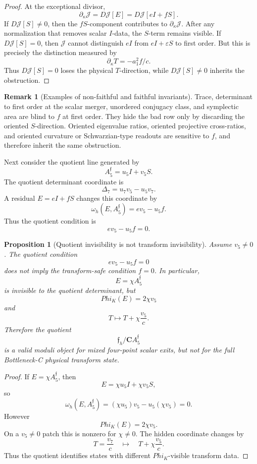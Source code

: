 \documentclass[11pt,a4paper]{amsart}
\def\Phi{Phi}%
\theoremstyle{plain}
\newtheorem{proposition}[theorem]{Proposition}
\theoremstyle{definition}
\newtheorem{remark}[theorem]{Remark}
\begin{document}
\begin{proof}
At the exceptional divisor,
\[
\partial_\kappa\mathcal J
=
D\mathcal J[E]
=
D\mathcal J[eI+fS].
\]
If \(D\mathcal J[S]\ne0\), then the \(fS\)-component contributes to
\(\partial_\kappa\mathcal J\).  After any normalization that removes scalar
\(I\)-data, the \(S\)-term remains visible.  If \(D\mathcal J[S]=0\), then
\(\mathcal J\) cannot distinguish \(eI\) from \(eI+\varepsilon S\) to first
order.  But this is precisely the distinction measured by
\[
\partial_\kappa T=-a_1^2 f/c.
\]
Thus \(D\mathcal J[S]=0\) loses the physical \(T\)-direction, while
\(D\mathcal J[S]\ne0\) inherits the obstruction.
\end{proof}

\begin{remark}[Examples of non-faithful and faithful invariants]
\label{rem:examples-local-invariant-no-go-bc}
Trace, determinant to first order at the scalar merger, unordered conjugacy
class, and symplectic area are blind to \(f\) at first order.  They hide the
bad row only by discarding the oriented \(S\)-direction.  Oriented eigenvalue
ratios, oriented projective cross-ratios, and oriented curvature or
Schwarzian-type readouts are sensitive to \(f\), and therefore inherit the
same obstruction.
\end{remark}

Next consider the quotient line generated by
\[
A_5^{\mathfrak f}=u_5I+v_5S.
\]
The quotient determinant coordinate is
\[
\Delta_7
=
u_7v_5-u_5v_7.
\]
A residual \(E=eI+fS\) changes this coordinate by
\[
\omega_h(E,A_5^{\mathfrak f})=ev_5-u_5f.
\]
Thus the quotient condition is
\[
ev_5-u_5f=0.
\]

\begin{proposition}[Quotient invisibility is not transform invisibility]
\label{prop:quotient-not-transform-invisibility-bc}
Assume \(v_5\ne0\).  The quotient condition
\[
ev_5-u_5f=0
\]
does not imply the transform-safe condition \(f=0\).  In particular,
\[
E=\chi A_5^{\mathfrak f}
\]
is invisible to the quotient determinant, but
\[
\Phi_K(E)=2\chi v_5
\]
and
\[
T\mapsto T+\chi\frac{v_5}{c}.
\]
Therefore the quotient
\[
\mathfrak f_h/\mathbf C A_5^{\mathfrak f}
\]
is a valid moduli object for mixed four-point scalar exits, but not for the
full Bottleneck-C physical transform state.
\end{proposition}

\begin{proof}
If \(E=\chi A_5^{\mathfrak f}\), then
\[
E=\chi u_5I+\chi v_5S,
\]
so
\[
\omega_h(E,A_5^{\mathfrak f})
=
(\chi u_5)v_5-u_5(\chi v_5)
=
0.
\]
However
\[
\Phi_K(E)=2\chi v_5.
\]
On a \(v_5\ne0\) patch this is nonzero for \(\chi\ne0\).  The hidden coordinate
changes by
\[
T=\frac{v_7}{c}
\quad\mapsto\quad
T+\chi\frac{v_5}{c}.
\]
Thus the quotient identifies states with different \(\Phi_K\)-visible
transform data.
\end{proof}
\end{document}
